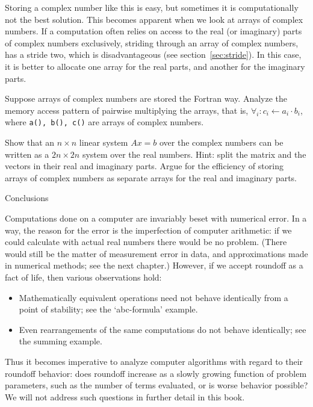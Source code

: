 Storing a complex number like this is easy, but sometimes it is
computationally not the best solution. This becomes apparent when we
look at arrays of complex numbers.
If a computation often relies
on access to the real (or imaginary) parts of complex numbers
exclusively, striding through an array of complex numbers, has a
stride two, which is disadvantageous (see
section~\ref{sec:stride}). In this case, it is better to allocate one
array for the real parts, and another for the imaginary parts.

\begin{exercise}
  Suppose arrays of complex numbers are stored the Fortran
  way. Analyze the memory access pattern of pairwise multiplying the
  arrays, that is, $\forall_i\colon c_i\leftarrow a_i\cdot b_i$, where
  \texttt{a(), b(), c()} are arrays of complex numbers.
\end{exercise}

\begin{exercise}
  Show that an $n\times n$ linear system $Ax=b$ over the complex numbers
  can be written as a $2n\times 2n$ system over the real
  numbers. Hint: split the matrix and the vectors in their real and
  imaginary parts. Argue for the efficiency of storing arrays of
  complex numbers as separate arrays for the real and imaginary parts.
\end{exercise}


 {Conclusions}

Computations done on a computer are invariably beset with numerical error.
In a way, the reason for the error is the imperfection of computer
arithmetic: if we could calculate with actual real numbers there would
be no problem. (There would still be the matter of measurement error
in data, and approximations made in numerical methods; see the next
chapter.) However, if we accept roundoff as a fact of life, then
various observations hold:
\begin{itemize}
\item Mathematically equivalent operations need not behave identically
  from a point of stability; see the `abc-formula' example.
\item Even rearrangements of the same computations do not behave
  identically; see the summing example.
\end{itemize}
Thus it
becomes imperative to analyze computer algorithms with regard to their
roundoff behavior: does roundoff increase as a slowly growing
function of problem parameters, such as the number of terms evaluated,
or is worse behavior possible? We will not address such questions in
further detail in this book.

